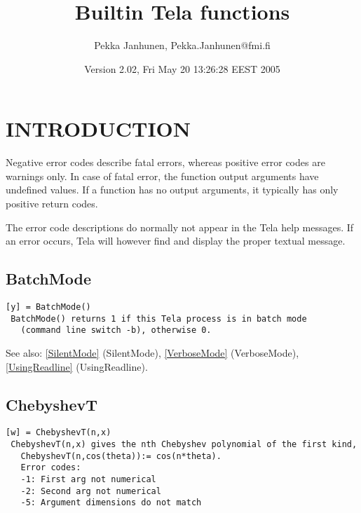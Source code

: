 \documentclass[a4paper]{article}
\title{Builtin Tela functions}
\author{Pekka Janhunen, {\ttfamily Pekka.Janhunen@fmi.fi}}
\date{Version 2.02, Fri May 20 13:26:28 EEST 2005}
\begin{document}
\maketitle
\tableofcontents

\section{INTRODUCTION}

Negative error codes describe fatal errors, whereas positive error
codes are warnings only. In case of fatal error, the function
output arguments have undefined values. If a function has no output
arguments, it typically has only positive return codes.

The error code descriptions do normally not appear in the Tela
help messages. If an error occurs, Tela will however find and
display the proper textual message.




\subsection{BatchMode\label{BatchMode}}

\begin{tscreen}
\begin{verbatim}
[y] = BatchMode()
 BatchMode() returns 1 if this Tela process is in batch mode
   (command line switch -b), otherwise 0.
\end{verbatim}

See also: \ref{SilentMode} {(SilentMode)}, \ref{VerboseMode} {(VerboseMode)}, \ref{UsingReadline} {(UsingReadline)}.
\end{tscreen}





\subsection{ChebyshevT\label{ChebyshevT}}

\begin{tscreen}
\begin{verbatim}
[w] = ChebyshevT(n,x)
 ChebyshevT(n,x) gives the nth Chebyshev polynomial of the first kind,
   ChebyshevT(n,cos(theta)):= cos(n*theta).
   Error codes:
   -1: First arg not numerical
   -2: Second arg not numerical
   -5: Argument dimensions do not match
 
\end{verbatim}
\end{tscreen}
\end{document}
